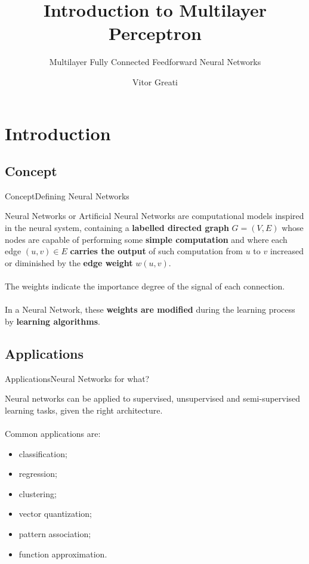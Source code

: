 \documentclass{beamer}
\title{Introduction to Multilayer Perceptron}
\subtitle{Multilayer Fully Connected Feedforward Neural Networks}
\author{Vitor Greati\inst{1}}
\institute[]
{
	\inst{1}%
	Federal University of Rio Grande do Norte
}
\date{}
\begin{document}
\frame{\titlepage}

\section{Introduction}

    \subsection{Concept}

         \begin{frame}{Concept}{Defining Neural Networks}

            Neural Networks or Artificial Neural Networks are computational models
            inspired in the neural system, containing a \textbf{labelled directed graph} $G=(V,E)$ whose nodes 
            are capable of performing some \textbf{simple computation} and where each edge $(u,v) \in E$ \textbf{carries the output}
            of such computation from $u$ to $v$ increased or diminished by the \textbf{edge weight} $w(u,v)$.\\~\\ 

The weights
            indicate the importance degree of the signal of each connection.\\~\\

In a Neural Network,
            these \textbf{weights are modified} during the learning process by \textbf{learning algorithms}.

        \end{frame}

    \subsection{Applications}
        \begin{frame}{Applications}{Neural Networks for what?}

            Neural networks can be applied to supervised, unsupervised and semi-supervised learning
            tasks, given the right architecture.\\~\\

            Common applications are:
            \begin{itemize}
                \item classification;
                \item regression;
                \item clustering;
                \item vector quantization;
                \item pattern association;
                \item function approximation.
            \end{itemize}
        \end{frame}
\end{document}
